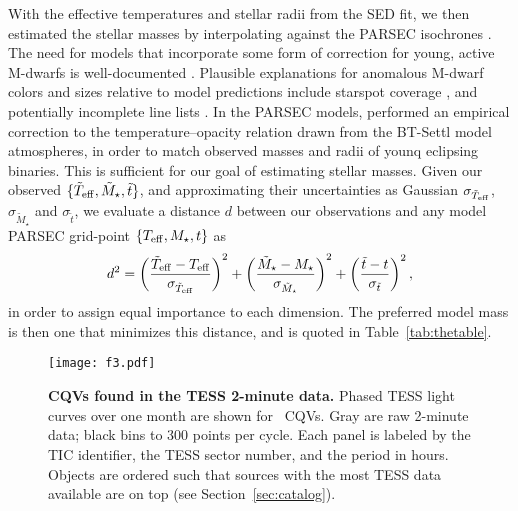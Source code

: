 \documentclass[11pt,twocolumn,tighten]{aastex63}
\begin{document}
With the effective temperatures and stellar radii from the SED fit, we
then estimated the stellar masses by interpolating against the PARSEC
isochrones \citep[v1.2S][]{2014MNRAS.444.2525C}.  The need for models
that incorporate some form of correction for young, active M-dwarfs is
well-documented
\citep[e.g.][]{2012ApJ...756...47S,2015ApJ...804..146D,2016A&A...593A..99F,2020ApJ...891...29S}.
Plausible explanations for anomalous M-dwarf colors and sizes relative
to model predictions include starspot coverage
\citep[e.g.][]{2017ApJ...836..200G}, and potentially incomplete line
lists \citep[e.g.][]{2013A&A...556A..15R}.  In the PARSEC models,
\citet{2014MNRAS.444.2525C} performed an empirical correction to the
temperature--opacity relation drawn from the BT-Settl model
atmospheres, in order to match observed masses and radii of younq
eclipsing binaries.  This is sufficient for our goal of estimating
stellar masses.  Given our observed $\{ \tilde{T}_{\rm eff},
\tilde{M}_\star, \tilde{t} \}$, and approximating their uncertainties
as Gaussian $\sigma_{\tilde{T}_{\rm eff}}$, $\sigma_{\tilde{M}_\star}$
and $\sigma_{\tilde{t}}$, we evaluate a distance $d$ between our
observations and any model PARSEC grid-point $\{ T_{\rm eff}, M_\star,
t \}$ as
\begin{equation}
  d^2 = 
  \left( \frac{\tilde{T}_{\rm eff} - T_{\rm eff}}{\sigma_{\tilde{T}_{\rm eff}}} \right)^2
  +
  \left( \frac{\tilde{M}_{\star} - M_{\star}}{\sigma_{\tilde{M}_{\star}}} \right)^2
  +
  \left( \frac{\tilde{t} - t}{\sigma_{\tilde{t}}} \right)^2,
\end{equation}
in order to assign equal importance to each dimension.  The preferred
model mass is then one that minimizes this distance, and is quoted in
Table~\ref{tab:thetable}.


\begin{figure*}[!tp]
	\begin{center}
		\centering
		\texttt{[image: f3.pdf]}
    \vspace{-0.3cm}
		\caption{
      {\bf CQVs found in the TESS 2-minute data.}
      Phased TESS light curves over one month are shown for \ngoods\
      CQVs.  Gray are raw 2-minute data; black bins to 300 points per
      cycle.  Each panel is labeled by the TIC identifier, the TESS
      sector number, and the period in hours.  Objects are ordered
      such that sources with the most TESS data available are on top
      (see Section~\ref{sec:catalog}).
		}
		\label{fig:cqvs}
	\end{center}
\end{figure*}
\end{document}
